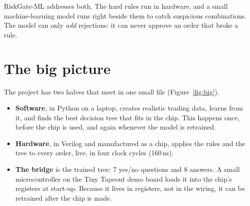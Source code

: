 \documentclass[11pt,a4paper]{article}
\begin{document}
RiskGate-ML addresses both. The hard rules run in hardware, and a small machine-learning
model runs right beside them to catch suspicious combinations. The model can only
\emph{add} rejections: it can never approve an order that broke a rule.

\section{The big picture}

The project has two halves that meet in one small file (Figure~\ref{fig:big}).

\begin{itemize}
  \item \textbf{Software}, in Python on a laptop, creates realistic trading data, learns from it,
        and finds the best decision tree that fits in the chip. This happens once, before the chip
        is used, and again whenever the model is retrained.
  \item \textbf{Hardware}, in Verilog and manufactured as a chip, applies the rules and the
        tree to every order, live, in four clock cycles (160\,ns).
  \item \textbf{The bridge} is the trained tree: 7 yes/no questions and 8 answers. A small
        microcontroller on the Tiny Tapeout demo board loads it into the chip's registers at
        start-up. Because it lives in registers, not in the wiring, it can be retrained after the
        chip is made.
\end{itemize}
\end{document}
